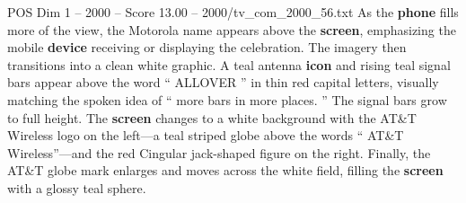 \begin{textsample}{POS Dim 1 – 2000 – Score 13.00 – 2000/tv\_com\_2000\_56.txt}
As the \textbf{phone} fills more of the view, the Motorola name appears above the \textbf{screen}, emphasizing the mobile \textbf{device} receiving or displaying the celebration.
The imagery then transitions into a clean white graphic.
A teal antenna \textbf{icon} and rising teal signal bars appear above the word “ ALLOVER ” in thin red capital letters, visually matching the spoken idea of “ more bars in more places. ” The signal bars grow to full height.
The \textbf{screen} changes to a white background with the AT\&T Wireless logo on the left—a teal striped globe above the words “ AT\&T Wireless”—and the red Cingular jack-shaped figure on the right.
Finally, the AT\&T globe mark enlarges and moves across the white field, filling the \textbf{screen} with a glossy teal sphere.

\end{textsample}

